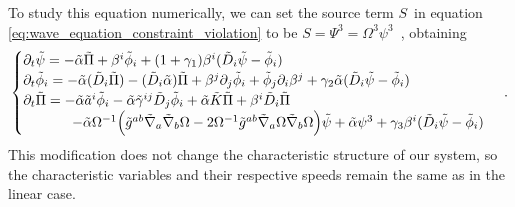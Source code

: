 To study this equation numerically, we can set the source term $S$~in equation \eqref{eq:wave_equation_constraint_violation} to be $S = \Psi^3 = \Omega^3 \psi^3$~, obtaining 
%
\begin{align}
    \begin{cases}
        \partial_t \tilde{\psi} = - \tilde{\alpha} \tilde{\Pi} + \beta^i \tilde{\phi}_i + (1 + \gamma_1) \beta^i (\tilde{D}_i \tilde{\psi} - \tilde{\phi}_i) \\
        \partial_t \tilde{\phi}_i = - \tilde{\alpha} (\tilde{D}_i \tilde{\Pi}) - (\tilde{D}_i \tilde{\alpha}) \tilde{\Pi} + \beta^j \partial_j \tilde{\phi}_i + \tilde{\phi}_j \partial_i \beta^j + \gamma_2 \tilde{\alpha} (\tilde{D}_i \tilde{\psi} - \tilde{\phi}_i) \\
        \partial_t \tilde{\Pi} = - \tilde{\alpha} \tilde{a}^i \tilde{\phi}_i - \tilde{\alpha} \tilde{\gamma}^{ij} \tilde{D}_j \tilde{\phi}_i + \tilde{\alpha} \tilde{K} \tilde{\Pi} + \beta^i \tilde{D}_i \tilde{\Pi} \\
        \hspace{3.5em} - \tilde{\alpha} \Omega^{-1} \Big( \tilde{g}^{ab} \tilde{\nabla}_a \tilde{\nabla}_b \Omega - 2 \Omega^{-1} \tilde{g}^{ab} \tilde{\nabla}_a \Omega \tilde{\nabla}_b \Omega \Big) \tilde{\psi} + \tilde{\alpha} \psi^3 + \gamma_3 \beta^i (\tilde{D}_i \tilde{\psi} - \tilde{\phi}_i)
    \end{cases}\,.
    \label{eq:cubic_wave_equation_constraint_violation}
\end{align}
%
This modification does not change the characteristic structure of our system, so the characteristic variables and their respective speeds remain the same as in the linear case.